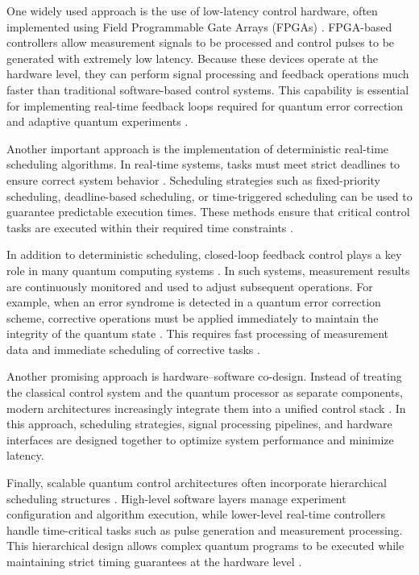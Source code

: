 \documentclass[12pt,a4paper]{article}
\begin{document}
One widely used approach is the use of low-latency control hardware, often implemented using Field Programmable Gate Arrays (FPGAs) \cite{Salathé2018}. FPGA-based controllers allow measurement signals to be processed and control pulses to be generated with extremely low latency. Because these devices operate at the hardware level, they can perform signal processing and feedback operations much faster than traditional software-based control systems. This capability is essential for implementing real-time feedback loops required for quantum error correction and adaptive quantum experiments \cite{Reuer2023}.

Another important approach is the implementation of deterministic real-time scheduling algorithms. In real-time systems, tasks must meet strict deadlines to ensure correct system behavior \cite{Liu2000}. Scheduling strategies such as fixed-priority scheduling, deadline-based scheduling, or time-triggered scheduling can be used to guarantee predictable execution times. These methods ensure that critical control tasks are executed within their required time constraints \cite{Kopetz2011}.

In addition to deterministic scheduling, closed-loop feedback control plays a key role in many quantum computing systems \cite{Reuer2023}. In such systems, measurement results are continuously monitored and used to adjust subsequent operations. For example, when an error syndrome is detected in a quantum error correction scheme, corrective operations must be applied immediately to maintain the integrity of the quantum state \cite{article}. This requires fast processing of measurement data and immediate scheduling of corrective tasks \cite{Salathé2018}.

Another promising approach is hardware–software co-design. Instead of treating the classical control system and the quantum processor as separate components, modern architectures increasingly integrate them into a unified control stack \cite{QPArch}. In this approach, scheduling strategies, signal processing pipelines, and hardware interfaces are designed together to optimize system performance and minimize latency.

Finally, scalable quantum control architectures often incorporate hierarchical scheduling structures \cite{Reuer2023}. High-level software layers manage experiment configuration and algorithm execution, while lower-level real-time controllers handle time-critical tasks such as pulse generation and measurement processing. This hierarchical design allows complex quantum programs to be executed while maintaining strict timing guarantees at the hardware level \cite{Salathé2018}.
\end{document}
